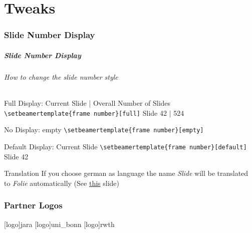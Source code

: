 %
\part{Tweaks}
\makepart
\section{Slide Number Display}

\begin{frame}[fragile,label=tweaks]
        \frametitle{Slide Number Display}
        \framesubtitle{How to change the slide number style}
        \begin{block}{Full Display: Current Slide | Overall Number of Slides}
                \scriptsize\verb+\setbeamertemplate{frame number}[full]+ \hfill
                \scriptsize{} Slide 42 $|$ 524
        \end{block}
        \begin{block}{No Display: empty}
                \scriptsize\verb+\setbeamertemplate{frame number}[empty]+ \hfill
                \scriptsize{}
        \end{block}
        \begin{block}{Default Display: Current Slide}
                \scriptsize\verb+\setbeamertemplate{frame number}[default]+ \hfill
                \scriptsize{} Slide 42
        \end{block}
        \begin{block}{Translation}
        If you choose german as language the name \emph{Slide} will be translated
        to \emph{Folie} automatically (See \hyperlink{translation}{\alert{this}}
        slide)
        \end{block}
\end{frame}


\section{Partner Logos}

[logo]{jara}%
[logo]{uni_bonn}%
[logo]{rwth}%

